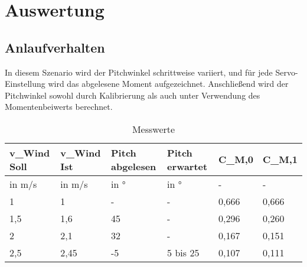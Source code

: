 \section{Auswertung}
\label{sec:Auswertung}
\subsection{Anlaufverhalten}
In diesem Szenario wird der Pitchwinkel schrittweise variiert, und für jede Servo-Einstellung  wird das abgelesene Moment aufgezeichnet. Anschließend wird der Pitchwinkel sowohl durch Kalibrierung als auch unter Verwendung des Momentenbeiwerts berechnet.
\begin{table}[ht!]
    \centering
    \caption{Messwerte}
    \label{tab_Messwerte_Anlauf_230615}
    \begin{tabular}{|l|l|l|l|l|l|}
        \hline
        \rowcolor[HTML]{70AD47} 
        {\color[HTML]{FFFFFF} \textbf{v\_Wind   Soll}} & {\color[HTML]{FFFFFF} \textbf{v\_Wind Ist}} & {\color[HTML]{FFFFFF} \textbf{Pitch abgelesen}} & {\color[HTML]{FFFFFF} \textbf{Pitch erwartet}} & {\color[HTML]{FFFFFF} \textbf{C\_M,0}} & {\color[HTML]{FFFFFF} \textbf{C\_M,1}} \\ \hline
        \rowcolor[HTML]{70AD47} 
        in m/s                                         & in m/s                                      & in °                                            & in °                                           & -                                      & -                                      \\ \hline
        \rowcolor[HTML]{E2EFDA} 
        1                                              & 1                                           & -                                               & -                                              & 0,666                                  & 0,666                                  \\ \hline
        \rowcolor[HTML]{C6E0B4} 
        1,5                                            & 1,6                                         & 45                                              & -                                              & 0,296                                  & 0,260                                  \\ \hline
        \rowcolor[HTML]{E2EFDA} 
        2                                              & 2,1                                         & 32                                              & -                                              & 0,167                                  & 0,151                                  \\ \hline
        \rowcolor[HTML]{C6E0B4} 
        2,5                                            & 2,45                                        & -5                                              & 5 bis 25                                       & 0,107                                  & 0,111                                  \\ \hline
    \end{tabular}
\end{table}


